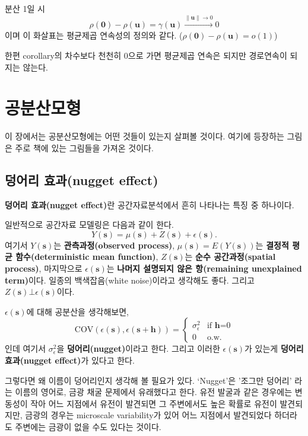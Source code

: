 \documentclass[b5paper,]{scrbook}
\theoremstyle{plain}
\theoremstyle{definition}
\numberwithin{equation}{section}
\begin{document}
분산 1일 시
\[\rho(\mathbf{0})-\rho(\mathbf{u})=\gamma(\mathbf{u}) \stackrel{\|\mathbf{u}\| \rightarrow 0}{\rightarrow} 0\]
이며 이 화살표는 평균제곱 연속성의 정의와 같다.
(\(\rho(\mathbf{0})-\rho(\mathbf{u})=o(1)\))

한편 corollary의 차수보다 천천히 0으로 가면 평균제곱 연속은 되지만
경로연속이 되지는 않는다.

\chapter{공분산모형}\label{covmodel}

이 장에서는 공분산모형에는 어떤 것들이 있는지 살펴볼 것이다. 여기에
등장하는 그림은 주로 \citep{Montero2015} 책에 있는 그림들을 가져온
것이다.

\section{덩어리 효과(nugget effect)}\label{-nugget-effect}

\textbf{덩어리 효과(nugget effect)}란 공간자료분석에서 흔히 나타나는
특징 중 하나이다.

일반적으로 공간자료 모델링은 다음과 같이 한다.
\[Y(\mathbf{s})=\mu(\mathbf{s})+Z(\mathbf{s})+\epsilon(\mathbf{s}).\]
여기서 \(Y(\mathbf{s})\)는 \textbf{관측과정(observed process)},
\(\mu(\mathbf{s})=E(Y(\mathbf{s}))\)는 \textbf{결정적 평균
함수(deterministic mean function)}, \(Z(\mathbf{s})\)는 \textbf{순수
공간과정(spatial process)}, 마지막으로 \(\epsilon(\mathbf{s})\)는
\textbf{나머지 설명되지 않은 항(remaining unexplained term)}이다. 일종의
백색잡음(white noise)이라고 생각해도 좋다. 그리고
\(Z(\mathbf{s}) \bot \epsilon(\mathbf{s})\)이다.

\(\epsilon(\mathbf{s})\)에 대해 공분산을 생각해보면, \[
\text{COV}(\epsilon(\mathbf{s}),\epsilon(\mathbf{s}+\mathbf{h}))= \left\{ \begin{array}{ll}
\sigma_{\epsilon}^{2} & \textrm{if $\mathbf{h}$=0}\\
0 & \textrm{o.w.}
\end{array} \right.
\] 인데 여기서 \(\sigma_{\epsilon}^{2}\)을 \textbf{덩어리(nugget)}이라고
한다. 그리고 이러한 \(\epsilon(\mathbf{s})\)가 있는게 \textbf{덩어리
효과(nugget effect)}가 있다고 한다.

그렇다면 왜 이름이 덩어리인지 생각해 볼 필요가 있다. `Nugget'은 '조그만
덩어리' 라는 이름의 영어로, 금광 채굴 문제에서 유래했다고 한다. 유전
발굴과 같은 경우에는 변동성이 작아 어느 지점에서 유전이 발견되면 그
주변에서도 높은 확률로 유전이 발견되지만, 금광의 경우는 microscale
variability가 있어 어느 지점에서 발견되었다 하더라도 주변에는 금광이
없을 수도 있다는 것이다.
\end{document}
